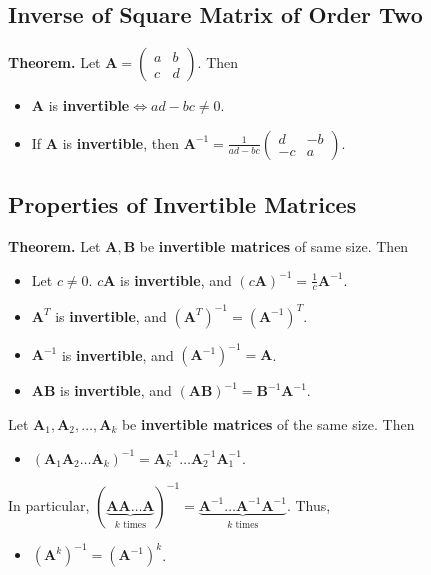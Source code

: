 \documentclass[../ma2001_notes.tex]{subfiles}
\begin{document}
\subsection{Inverse of Square Matrix of Order Two}
\textbf{Theorem.} Let \(\bm{A}=\begin{pmatrix}
	a & b \\ c & d
\end{pmatrix}\). Then
\begin{itemize}
	\item\(\bm{A}\) is \textbf{invertible}\(\iff ad-bc\ne0\).
	\item If \(\bm{A}\) is \textbf{invertible}, then \(\displaystyle\bm{A}^{-1}=\frac{1}{ad-bc}\begin{pmatrix}
		d & -b \\ -c & a
	\end{pmatrix}\).
\end{itemize}

\subsection{Properties of Invertible Matrices}
\textbf{Theorem.} Let \(\bm{A},\bm{B}\) be \textbf{invertible matrices} of same size. Then
\begin{itemize}
	\item Let \(c\ne0\). \(c\bm{A}\) is \textbf{invertible}, and \(\displaystyle(c\bm{A})^{-1}=\frac{1}{c}\bm{A}^{-1}\).
	\item\(\bm{A}^T\) is \textbf{invertible}, and \((\bm{A}^T)^{-1}=(\bm{A}^{-1})^T\).
	\item\(\bm{A}^{-1}\) is \textbf{invertible}, and \((\bm{A}^{-1})^{-1}=\bm{A}\).
	\item\(\bm{AB}\) is \textbf{invertible}, and \((\bm{AB})^{-1}=\bm{B}^{-1}\bm{A}^{-1}\).
\end{itemize}
Let \(\bm{A}_1,\bm{A}_2,\ldots,\bm{A}_k\) be \textbf{invertible matrices} of the same size. Then
\begin{itemize}
	\item\((\bm{A}_1\bm{A}_2\ldots\bm{A}_k)^{-1}=\bm{A}_k^{-1}\ldots\bm{A}_2^{-1}\bm{A}_1^{-1}\).
\end{itemize}
In particular, \((\underbrace{\bm{A}\bm{A}\ldots\bm{A}}_{k\text{ times}})^{-1}=\underbrace{\bm{A}^{-1}\ldots\bm{A}^{-1}\bm{A}^{-1}}_{k\text{ times}}\). Thus,
\begin{itemize}
	\item\((\bm{A}^k)^{-1}=(\bm{A}^{-1})^k\).
\end{itemize}
\end{document}

